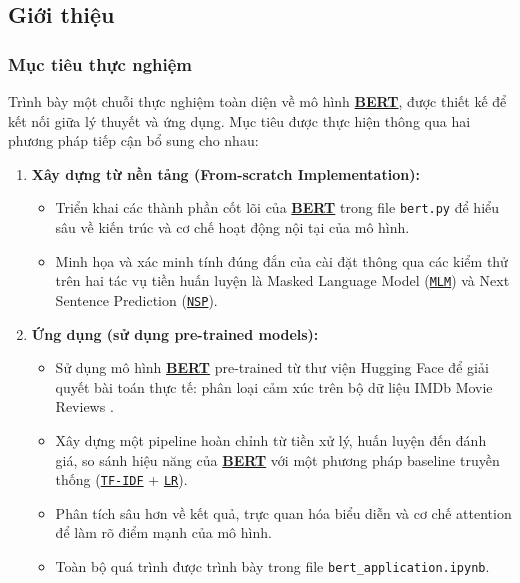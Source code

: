     \subsection{Giới thiệu}
    \label{ssec:gioi_thieu_thuc_nghiem}
    
    \subsubsection{Mục tiêu thực nghiệm}
    Trình bày một chuỗi thực nghiệm toàn diện về mô hình \hyperref[acro:bert]{\textbf{BERT}}, được thiết kế để kết nối giữa lý thuyết và ứng dụng. Mục tiêu được thực hiện thông qua hai phương pháp tiếp cận bổ sung cho nhau:
    
    \begin{enumerate}
        \item \textbf{Xây dựng từ nền tảng (From-scratch Implementation):} 
        \begin{itemize}
            \item Triển khai các thành phần cốt lõi của \hyperref[acro:bert]{\textbf{BERT}} trong file \texttt{bert.py} để hiểu sâu về kiến trúc và cơ chế hoạt động nội tại của mô hình.
            \item Minh họa và xác minh tính đúng đắn của cài đặt thông qua các kiểm thử trên hai tác vụ tiền huấn luyện là Masked Language Model (\hyperref[acro:mlm]{\texttt{MLM}}) và Next Sentence Prediction (\hyperref[acro:nsp]{\texttt{NSP}}).
        \end{itemize}
        \item \textbf{Ứng dụng (sử dụng pre-trained models):} 
        \begin{itemize}
            \item Sử dụng mô hình \hyperref[acro:bert]{\textbf{BERT}} pre-trained từ thư viện Hugging Face để giải quyết bài toán thực tế: phân loại cảm xúc trên bộ dữ liệu IMDb Movie Reviews \cite{maas2011learning}.
            \item Xây dựng một pipeline hoàn chỉnh từ tiền xử lý, huấn luyện đến đánh giá, so sánh hiệu năng của \hyperref[acro:bert]{\textbf{BERT}} với một phương pháp baseline truyền thống (\hyperref[acro:tfidf]{\texttt{TF-IDF}} + \hyperref[acro:lr]{\texttt{LR}}).
            \item Phân tích sâu hơn về kết quả, trực quan hóa biểu diễn và cơ chế attention để làm rõ điểm mạnh của mô hình.
            \item Toàn bộ quá trình được trình bày trong file \texttt{bert\_application.ipynb}.
        \end{itemize}
    \end{enumerate}
    
